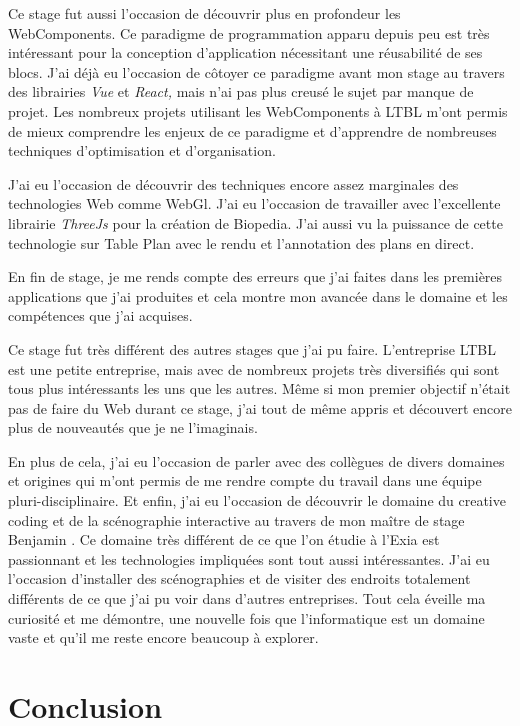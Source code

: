 \documentclass{article}
\begin{document}
    Ce stage fut aussi l'occasion de découvrir plus en profondeur les WebComponents.
    Ce paradigme de programmation apparu depuis peu est très intéressant pour la conception d'application nécessitant une réusabilité de ses blocs.
    J'ai déjà eu l'occasion de côtoyer ce paradigme avant mon stage au travers des librairies \emph{Vue} et \emph{React,} mais n'ai pas plus creusé le sujet par manque de projet.
    Les nombreux projets utilisant les WebComponents à LTBL m'ont permis de mieux comprendre les enjeux de ce paradigme et d'apprendre de nombreuses techniques d'optimisation et d'organisation.

    J'ai eu l'occasion de découvrir des techniques encore assez marginales des technologies Web comme WebGl.
    J'ai eu l'occasion de travailler avec l'excellente librairie \emph{ThreeJs} pour la création de Biopedia.
    J'ai aussi vu la puissance de cette technologie sur Table Plan avec le rendu et l'annotation des plans en direct.

    En fin de stage, je me rends compte des erreurs que j'ai faites dans les premières applications que j'ai produites et cela montre mon avancée dans le domaine et les compétences que j'ai acquises.

    Ce stage fut très différent des autres stages que j'ai pu faire.
    L'entreprise LTBL est une petite entreprise, mais avec de nombreux projets très diversifiés qui sont tous plus intéressants les uns que les autres.
    Même si mon premier objectif n'était pas de faire du Web durant ce stage, j'ai tout de même appris et découvert encore plus de nouveautés que je ne l'imaginais.

    En plus de cela, j'ai eu l'occasion de parler avec des collègues de divers domaines et origines qui m'ont permis de me rendre compte du travail dans une équipe pluri-disciplinaire.
    Et enfin, j'ai eu l'occasion de découvrir le domaine du creative coding et de la scénographie interactive au travers de mon maître de stage Benjamin .
    Ce domaine très différent de ce que l'on étudie à l'Exia est passionnant et les technologies impliquées sont tout aussi intéressantes.
    J'ai eu l'occasion d'installer des scénographies et de visiter des endroits totalement différents de ce que j'ai pu voir dans d'autres entreprises.
    Tout cela éveille ma curiosité et me démontre, une nouvelle fois que l'informatique est un domaine vaste et qu'il me reste encore beaucoup à explorer.

    \clearpage

    \section{Conclusion}
\end{document}

